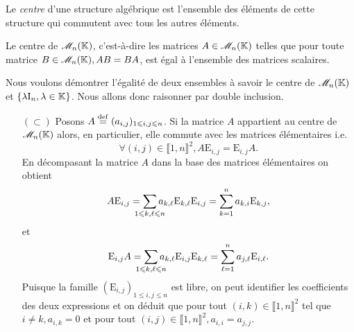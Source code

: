 \begin{defi}
    Le \emph{centre} d'une structure algébrique est l'ensemble des éléments de cette structure qui commutent avec tous les autres éléments. 
\end{defi}

\begin{prop}[Centre de $\M_n(\K)$]
Le centre de $\M_n(\K)$, c'est-à-dire les matrices $A \in \mathscr{M}_n(\mathbb{K})$ telles que pour toute matrice $B \in \mathscr{M}_n(\mathbb{K}), AB = BA$, est égal à l'ensemble des matrices scalaires.
\end{prop}

Nous voulons démontrer l'égalité de deux ensembles à savoir le centre de $\M_n(\K)$ et $\{ \lambda \mathrm{I}_n, \lambda \in \mathbb{K} \}$. Nous allons donc raisonner par double inclusion. 
\begin{demo}
    \begin{itemize}
        \item[$(\subset)$] Posons $A \overset{\mathrm{\tiny def}}{=} (a_{i,j})_{1 \leqslant i, j \leqslant n}$. Si la matrice $A$ appartient au centre de $\M_n(\K)$ alors, en particulier, elle commute avec les matrices élémentaires \note i.e. 
        $$\forall (i, j) \in \llbracket 1, n \rrbracket^2, A \mathrm{E}_{i,j} = \mathrm{E}_{i,j} A.$$
        En décompasant la matrice $A$ dans la base des matrices élémentaires on obtient
        $$A \mathrm{E}_{i,j} = \smashoperator{\sum_{1 \leqslant k, \ell \leqslant n}} a_{k, \ell} \mathrm{E}_{k,\ell} \mathrm{E}_{i,j} = \sum_{k=1}^{n} a_{k,i} \mathrm{E}_{k,j},$$
        et
        $$\mathrm{E}_{i,j} A = \smashoperator{\sum_{1 \leqslant k, \ell \leqslant n}} a_{k, \ell} \mathrm{E}_{i,j} \mathrm{E}_{k,\ell} = \sum_{\ell=1}^{n} a_{j,\ell} \mathrm{E}_{i,\ell}.$$
        Puisque la famille $(\mathrm{E}_{i, j})_{1 \leqslant i, j \leqslant n}$ est libre, on peut identifier les coefficients des deux expressions et on déduit que pour tout $(i, k) \in \llbracket 1, n \rrbracket^2$ tel que $i \not= k, a_{i,k}=0$ et pour tout $(i,j) \in \llbracket 1, n \rrbracket^2, a_{i,i}=a_{j,j}$. \\

\end{itemize}
\end{demo}
